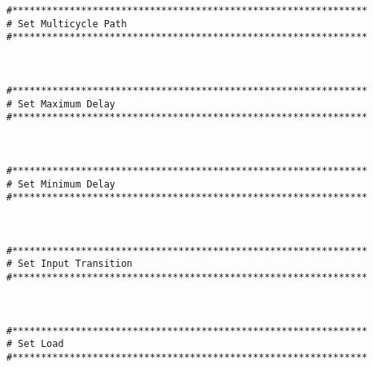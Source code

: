\documentclass[dvipdfm]{book}
\begin{document}
\begin{verbatim}
#**************************************************************
# Set Multicycle Path
#**************************************************************



#**************************************************************
# Set Maximum Delay
#**************************************************************



#**************************************************************
# Set Minimum Delay
#**************************************************************



#**************************************************************
# Set Input Transition
#**************************************************************



#**************************************************************
# Set Load
#**************************************************************




\end{verbatim}
\end{document}
